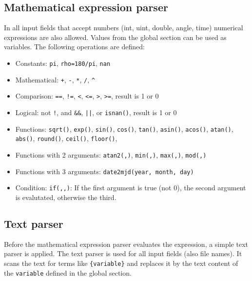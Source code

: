 
\subsection{Mathematical expression parser}\label{general.parser:expression}
In all input fields that accept numbers (int, uint, double, angle, time) numerical
expressions are also allowed. Values from the global section can be used as variables. The following
operations are defined:
\begin{itemize}
\item Constants:    \verb|pi|, \verb|rho=180/pi|, \verb|nan|
\item Mathematical: \verb|+|, \verb|-|, \verb|*|, \verb|/|, \verb|^|
\item Comparison:   \verb|==|, \verb|!=|, \verb|<|, \verb|<=|, \verb|>|, \verb|>=|, result is 1 or 0
\item Logical:      not \verb|!|, and \verb|&&|, \verb'||', or \verb|isnan()|, result is 1 or 0
\item Functions:    \verb|sqrt()|, \verb|exp()|,
                    \verb|sin()|,  \verb|cos()|, \verb|tan()|,
                    \verb|asin()|,  \verb|acos()|,  \verb|atan()|,
                    \verb|abs()|,  \verb|round()|,  \verb|ceil()|,  \verb|floor()|,
\item Functions with 2 arguments: \verb|atan2(,)|, \verb|min(,)|, \verb|max(,)|, \verb|mod(,)|
\item Functions with 3 arguments: \verb|date2mjd(year, month, day)|
\item Condition: \verb|if(,,)|: If the first argument is true (not 0), the second argument is evalutated, otherwise the third.
\end{itemize}


\subsection{Text parser}\label{general.parser:text}
Before the mathematical expression parser evaluates the expression, a simple text parser is applied.
The text parser is used for all input fields (also file names). It scans the text for terms like
\verb|{variable}| and replaces it by the text content of the \verb|variable| defined in the global section.

